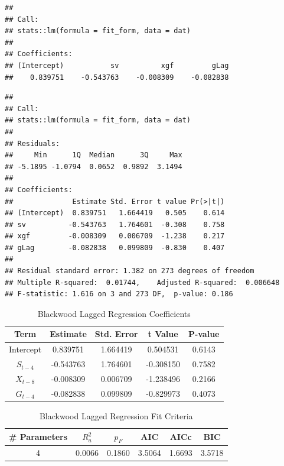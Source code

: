 \documentclass[
  10pt,
]{extarticle}
\newenvironment{Shaded}{\begin{snugshade}}{\end{snugshade}}
\newcommand{\FunctionTok}[1]{\textcolor[rgb]{0.13,0.29,0.53}{\textbf{#1}}}
\newcommand{\NormalTok}[1]{#1}
\newcommand{\SpecialCharTok}[1]{\textcolor[rgb]{0.81,0.36,0.00}{\textbf{#1}}}
\begin{document}
\begin{verbatim}
## 
## Call:
## stats::lm(formula = fit_form, data = dat)
## 
## Coefficients:
## (Intercept)           sv          xgf         gLag  
##    0.839751    -0.543763    -0.008309    -0.082838
\end{verbatim}

\begin{Shaded}
\end{Shaded}

\begin{verbatim}
## 
## Call:
## stats::lm(formula = fit_form, data = dat)
## 
## Residuals:
##     Min      1Q  Median      3Q     Max 
## -5.1895 -1.0794  0.0652  0.9892  3.1494 
## 
## Coefficients:
##              Estimate Std. Error t value Pr(>|t|)
## (Intercept)  0.839751   1.664419   0.505    0.614
## sv          -0.543763   1.764601  -0.308    0.758
## xgf         -0.008309   0.006709  -1.238    0.217
## gLag        -0.082838   0.099809  -0.830    0.407
## 
## Residual standard error: 1.382 on 273 degrees of freedom
## Multiple R-squared:  0.01744,    Adjusted R-squared:  0.006648 
## F-statistic: 1.616 on 3 and 273 DF,  p-value: 0.186
\end{verbatim}

\begin{center}
\scriptsize
\begin{table}[H]

\caption{\label{tab:blackwood-lag-reg-coef}Blackwood Lagged Regression Coefficients}
\centering
\begin{tabular}[t]{ccccc}
\toprule
Term & Estimate & Std. Error & t Value & P-value\\
\midrule
Intercept & 0.839751 & 1.664419 & 0.504531 & 0.6143\\
$S_{t-4}$ & -0.543763 & 1.764601 & -0.308150 & 0.7582\\
$X_{t-8}$ & -0.008309 & 0.006709 & -1.238496 & 0.2166\\
$G_{t-4}$ & -0.082838 & 0.099809 & -0.829973 & 0.4073\\
\bottomrule
\end{tabular}
\end{table}
\normalsize
\end{center}

\begin{center}
\scriptsize
\begin{table}[H]

\caption{\label{tab:blackwood-lag-reg-fit}Blackwood Lagged Regression Fit Criteria}
\centering
\begin{tabular}[t]{cccccc}
\toprule
\# Parameters & $R_a^2$ & $p_F$ & AIC & AICc & BIC\\
\midrule
4 & 0.0066 & 0.1860 & 3.5064 & 1.6693 & 3.5718\\
\bottomrule
\end{tabular}
\end{table}
\normalsize
\end{center}
\end{document}
